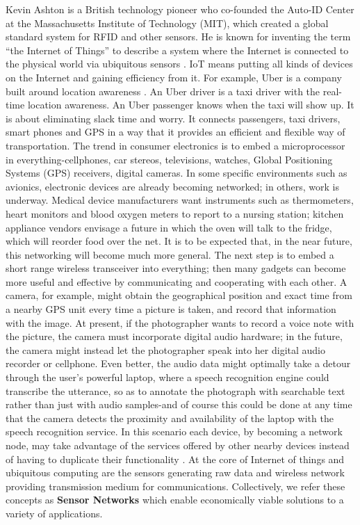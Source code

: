 	Kevin Ashton is a British technology pioneer who co-founded the Auto-ID Center at the Massachusetts Institute of Technology (MIT), which created a global standard system for RFID and other sensors.
	He is known for inventing the term ``the Internet of Things'' to describe a system where the Internet is connected to the physical world via ubiquitous sensors \cite{ashton2009internet}.
	IoT means putting all kinds of devices on the Internet and gaining efficiency from it. 
	For example, Uber is a company built around location awareness \cite{Uber}.
	An Uber driver is a taxi driver with the real-time location awareness.
	An Uber passenger knows when the taxi will show up.
	It is about eliminating slack time and worry.
	It connects passengers, taxi drivers, smart phones and GPS in a way that it provides an efficient and flexible way of transportation.  
	The trend in consumer electronics is to embed a microprocessor in everything-cellphones, car stereos,  televisions, watches, Global Positioning Systems (GPS) receivers, digital cameras.
	In some specific environments such as avionics, electronic devices are already becoming networked; in others, work is underway.
	Medical device manufacturers want instruments such as thermometers, heart monitors and blood oxygen meters to report to a nursing station; kitchen appliance vendors envisage a future in which the oven will talk to the fridge, which will reorder food over the net. 
	It is to be expected that, in the near future, this networking will become much more general.
	The next step is to embed a short range wireless transceiver into everything; then many gadgets can become more useful and effective by communicating and cooperating with each other.
	A camera, for example, might obtain the geographical position and exact time from a nearby GPS unit every time a picture is taken, and record that information with the image.
	At present, if the photographer wants to record a voice note with the picture, the camera must incorporate digital audio hardware; in the future, the camera might instead let the photographer speak into her digital audio recorder or cellphone.
	Even better, the audio data might optimally take a detour through the user's powerful laptop, where a speech recognition engine could transcribe the utterance, so as to annotate the photograph with searchable text rather than just with audio samples-and of course this could be done at any time that the camera detects the proximity and availability of the laptop with the speech recognition service.
	In this scenario each device, by becoming a network node, may take advantage of the services offered by other nearby devices instead of having to duplicate their functionality \cite{2002-Stajano-ubiquitous}.
	At the core of Internet of things and ubiquitous computing are the sensors generating raw data and wireless network providing transmission medium for communications. 
	Collectively, we refer these concepts as \textbf{Sensor Networks} which enable economically viable solutions to a variety of applications.

